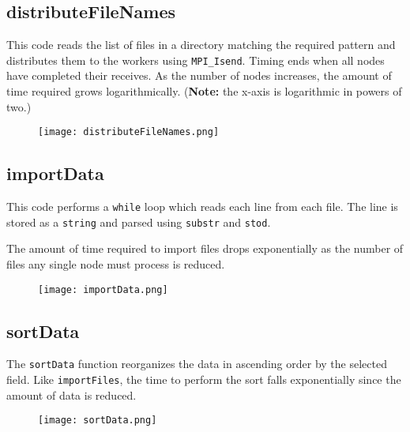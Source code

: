 \documentclass{article}
\begin{document}
\subsection{distributeFileNames}
This code reads the list of files in a directory matching the required pattern and distributes them to the workers using \texttt{MPI\_Isend}. Timing ends when all nodes have completed their receives. As the number of nodes increases, the amount of time required grows logarithmically. (\textbf{Note:} the x-axis is logarithmic in powers of two.)
\begin{figure}[!htb]
	\centering
	\texttt{[image: distributeFileNames.png]}
\end{figure}

\subsection{importData}
This code performs a \texttt{while} loop which reads each line from each file. The line is stored as a \texttt{string} and parsed using \texttt{substr} and \texttt{stod}.

The amount of time required to import files drops exponentially as the number of files any single node must process is reduced.
\begin{figure}[!htb]
	\centering
	\texttt{[image: importData.png]}
\end{figure}

\subsection{sortData}
The \texttt{sortData} function reorganizes the data in ascending order by the selected field. Like \texttt{importFiles}, the time to perform the sort falls exponentially since the amount of data is reduced.
\begin{figure}[!htb]
	\centering
	\texttt{[image: sortData.png]}
\end{figure}
\end{document}
